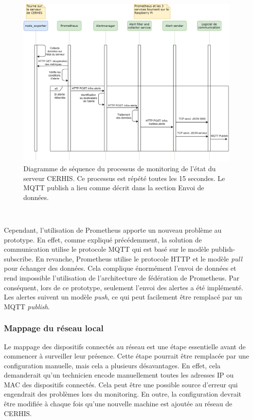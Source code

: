 \begin{figure}
  \includegraphics[width=\textwidth]{img/app/server_mon.png}
  \caption{Diagramme de séquence du processus de monitoring de l'état du serveur CERHIS. Ce processus est répété toutes les 15 secondes.
  Le MQTT publish a lieu comme décrit dans la section Envoi de données.}
  \label{fig:seqnodemon}
\end{figure}

~

\noindent
Cependant, l’utilisation de Prometheus apporte un nouveau problème au prototype. En effet, comme expliqué précédemment, la solution de communication utilise le protocole MQTT qui est basé sur le modèle publish-subscribe. En revanche, Prometheus utilise le protocole HTTP et le modèle \textit{pull} pour échanger des données. Cela complique énormément l’envoi de données et rend impossible l’utilisation de l’architecture de fédération de Prometheus. Par conséquent, lors de ce prototype, seulement l’envoi des alertes a été implémenté. Les alertes suivent un modèle \textit{push}, ce qui peut facilement être remplacé par un MQTT \textit{publish}.


\newpage
\subsubsection{Mappage du réseau local}

\noindent
Le mappage des dispositifs connectés au réseau est une étape essentielle avant de commencer à surveiller leur présence. Cette étape pourrait être remplacée par une configuration manuelle, mais cela a plusieurs désavantages. En effet, cela demanderait qu’un technicien encode manuellement toutes les adresses IP ou MAC des dispositifs connectés. Cela peut être une possible source d’erreur qui engendrait des problèmes lors du monitoring. En outre, la configuration devrait être modifiée à chaque fois qu’une nouvelle machine est ajoutée au réseau de CERHIS.

